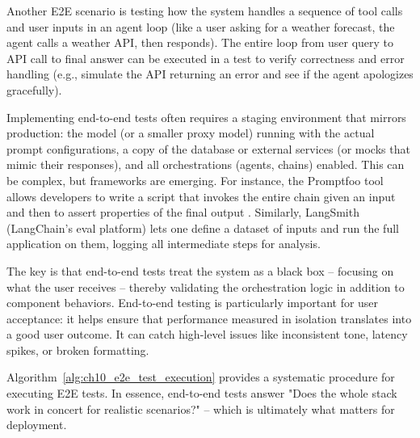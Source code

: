 Another E2E scenario is testing how the system handles a sequence of tool calls and user inputs in an agent loop (like a user asking for a weather forecast, the agent calls a weather API, then responds). The entire loop from user query to API call to final answer can be executed in a test to verify correctness and error handling (e.g., simulate the API returning an error and see if the agent apologizes gracefully).  

Implementing end-to-end tests often requires a staging environment that mirrors production: the model (or a smaller proxy model) running with the actual prompt configurations, a copy of the database or external services (or mocks that mimic their responses), and all orchestrations (agents, chains) enabled. This can be complex, but frameworks are emerging. For instance, the Promptfoo tool allows developers to write a script that invokes the entire chain given an input and then to assert properties of the final output \cite{promptfoo}. Similarly, LangSmith (LangChain's eval platform) lets one define a dataset of inputs and run the full application on them, logging all intermediate steps for analysis.  

The key is that end-to-end tests treat the system as a black box – focusing on what the user receives – thereby validating the orchestration logic in addition to component behaviors. End-to-end testing is particularly important for user acceptance: it helps ensure that performance measured in isolation translates into a good user outcome. It can catch high-level issues like inconsistent tone, latency spikes, or broken formatting.  

Algorithm~\ref{alg:ch10_e2e_test_execution} provides a systematic procedure for executing E2E tests. In essence, end-to-end tests answer "Does the whole stack work in concert for realistic scenarios?" – which is ultimately what matters for deployment.

